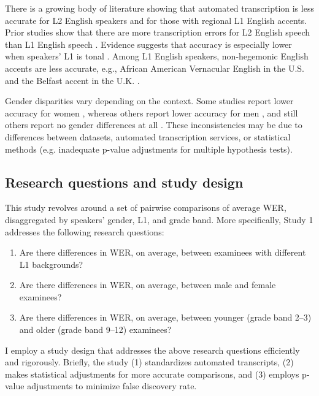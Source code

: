 \documentclass [PhD] {uclathes}
\begin{document}
There is a growing body of literature showing that automated transcription is less accurate for L2 English speakers and for those with regional L1 English accents. Prior studies show that there are more transcription errors for L2 English speech than L1 English speech \citep{dichristofano2023, markl2022, meyer2020}. Evidence suggests that accuracy is especially lower when speakers' L1 is tonal \citep{chan2022training}. Among L1 English speakers, non-hegemonic English accents are less accurate, e.g., African American Vernacular English in the U.S. \citep{koenecke2020} and the Belfast accent in the U.K. \citep{markl2022}.

Gender disparities vary depending on the context. Some studies report lower accuracy for women \citep{tatman2017a, hutiri2022}, whereas others report lower accuracy for men \citep{dichristofano2023, zuluaga2023, markl2022}, and still others report no gender differences at all \citep{chan2022training, tatman2017b}. These inconsistencies may be due to differences between datasets, automated transcription services, or statistical methods (e.g. inadequate p-value adjustments for multiple hypothesis tests).

\subsection{Research questions and study design}

This study revolves around a set of pairwise comparisons of average WER, disaggregated by speakers’ gender, L1, and grade band. More specifically, Study 1 addresses the following research questions:

\begin{enumerate}
	\item Are there differences in WER, on average, between examinees with different L1 backgrounds?
	\item Are there differences in WER, on average, between male and female examinees?
	\item Are there differences in WER, on average, between younger (grade band 2–3) and older (grade band 9–12) examinees?
\end{enumerate}

I employ a study design that addresses the above research questions efficiently and rigorously. Briefly, the study (1) standardizes automated transcripts, (2) makes statistical adjustments for more accurate comparisons, and (3) employs p-value adjustments to minimize false discovery rate.
\end{document}
